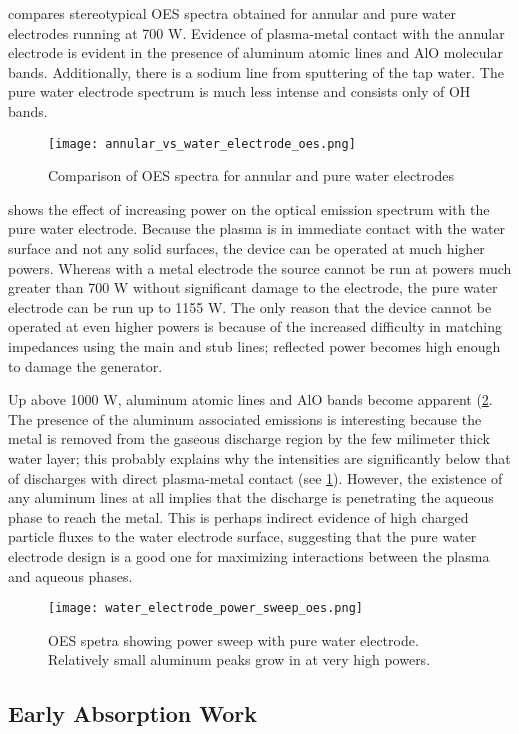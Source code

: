  compares stereotypical OES spectra obtained for annular and pure water electrodes running at 700 W. Evidence of plasma-metal contact with the annular electrode is evident in the presence of aluminum atomic lines and AlO molecular bands. Additionally, there is a sodium line from sputtering of the tap water. The pure water electrode spectrum is much less intense and consists only of OH bands.

\begin{figure}[htbp]
  \centering
  \texttt{[image: annular\_vs\_water\_electrode\_oes.png]}
  \caption{Comparison of OES spectra for annular and pure water electrodes}
  \label{fig:annular_vs_water_oes}
\end{figure}

 shows the effect of increasing power on the optical emission spectrum with the pure water electrode. Because the plasma is in immediate contact with the water surface and not any solid surfaces, the device can be operated at much higher powers. Whereas with a metal electrode the source cannot be run at powers much greater than 700 W without significant damage to the electrode, the pure water electrode can be run up to 1155 W. The only reason that the device cannot be operated at even higher powers is because of the increased difficulty in matching impedances using the main and stub lines; reflected power becomes high enough to damage the generator.

Up above 1000 W, aluminum atomic lines and AlO bands become apparent (\cref{fig:pow_sweep_water}. The presence of the aluminum associated emissions is interesting because the metal is removed from the gaseous discharge region by the few milimeter thick water layer; this probably explains why the intensities are significantly below that of discharges with direct plasma-metal contact (see \cref{fig:annular_vs_water_oes}). However, the existence of any aluminum lines at all implies that the discharge is penetrating the aqueous phase to reach the metal. This is perhaps indirect evidence of high charged particle fluxes to the water electrode surface, suggesting that the pure water electrode design is a good one for maximizing interactions between the plasma and aqueous phases.

\begin{figure}[htbp]
  \centering
  \texttt{[image: water\_electrode\_power\_sweep\_oes.png]}
  \caption{OES spetra showing power sweep with pure water electrode. Relatively small aluminum peaks grow in at very high powers.}
  \label{fig:pow_sweep_water}
\end{figure}


\subsection{Early Absorption Work}

